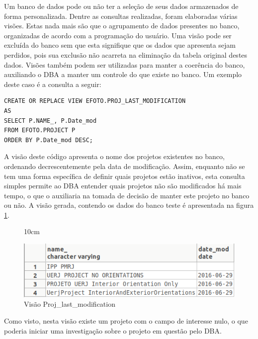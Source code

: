 Um banco de dados pode ou não ter a seleção de seus dados armazenados de forma personalizada. Dentre as consultas realizadas, foram elaboradas várias visões. Estas nada mais são que o agrupamento de dados presentes no banco, organizadas de acordo com a programação do usuário. Uma visão pode ser excluída do banco sem que esta signifique que os dados que apresenta sejam perdidos, pois sua exclusão não acarreta na eliminação da tabela original destes dados. Visões também podem ser utilizadas para manter a coerência do banco, auxiliando o DBA a manter um controle do que existe no banco. Um exemplo deste caso é a consulta a seguir:

\begin{lstlisting}
CREATE OR REPLACE VIEW EFOTO.PROJ_LAST_MODIFICATION
AS
SELECT P.NAME_, P.Date_mod
FROM EFOTO.PROJECT P
ORDER BY P.Date_mod DESC;
\end{lstlisting}

A visão deste código apresenta o nome dos projetos existentes no banco, ordenando decrescentemente pela data de modificação. Assim, enquanto não se tem uma forma específica de definir quais projetos estão inativos, esta consulta simples permite ao DBA entender quais projetos não são modificados há mais tempo, o que o auxiliaria na tomada de decisão de manter este projeto no banco ou não. A visão gerada, contendo os dados do banco teste é apresentada na figura \ref{date_mod}.
\begin{figure}[!ht]{10cm}
  \caption{Visão Proj\_last\_modification} \label{date_mod}
  \centering
  \includegraphics[width=0.8\hsize]{figuras/date_proj.png}
\end{figure}
Como visto, nesta visão existe um projeto com o campo de interesse nulo, o que poderia iniciar uma investigação sobre o projeto em questão pelo DBA.

